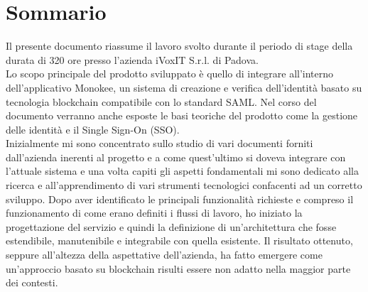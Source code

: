 
\cleardoublepage
{}
{}
\begingroup
\let\clearpage\relax
\let\cleardoublepage\relax
\let\cleardoublepage\relax

\chapter*{Sommario}

Il presente documento riassume il lavoro svolto durante il periodo di stage della durata
di 320 ore presso l’azienda iVoxIT S.r.l. di Padova.\\
Lo scopo principale del prodotto sviluppato è quello di integrare all'interno dell'applicativo Monokee, un sistema di creazione e verifica dell'identità basato su tecnologia blockchain compatibile con lo standard SAML. 
Nel corso del documento verranno anche esposte le basi teoriche del prodotto come la gestione delle identità e il Single Sign-On (SSO).\\
Inizialmente mi sono concentrato sullo studio di vari documenti forniti dall'azienda inerenti al progetto e a come quest'ultimo si doveva integrare con l'attuale sistema e
una volta capiti gli aspetti fondamentali mi sono dedicato alla ricerca e all'apprendimento di vari strumenti tecnologici
confacenti ad un corretto sviluppo.                 
Dopo aver identificato le principali funzionalità richieste e compreso il funzionamento di come erano definiti i flussi di lavoro, ho iniziato la progettazione del servizio e                                                   quindi la definizione di
un’architettura che fosse estendibile, manutenibile e integrabile con quella esistente. Il risultato ottenuto, seppure all’altezza della aspettative dell’azienda, ha fatto emergere come un'approccio basato su blockchain risulti essere non adatto nella maggior parte dei contesti.


%
%

\endgroup			

\vfill


